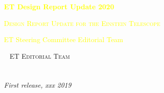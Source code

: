 
\begingroup
\thispagestyle{empty}

\centering
\par\normalfont\fontsize{50}{50}\sffamily\selectfont
\textcolor{yellow}{\textbf{ET Design Report Update 2020}}\\
\vskip6.5cm
\par\normalfont\fontsize{25}{25}\sffamily\selectfont
\textsc{\textcolor{yellow}{{Design Report Update for the Einstein Telescope}}}\par %
\vskip4cm
\textcolor{yellow}{\LARGE ET Steering Committee Editorial Team}\par %
\endgroup


\newpage
~\vfill
\thispagestyle{empty}
\noindent \textsc{ET Editorial Team}\\
\noindent \textsc{}\\ %
\noindent \\ %

\noindent \textit{First release, xxx 2019} %
\newpage


\pagestyle{empty} %
\tableofcontents %
\pagestyle{fancy} %
